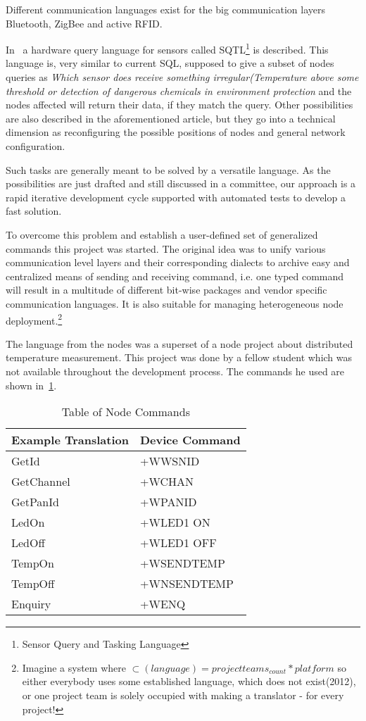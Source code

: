 Different communication languages exist for the big communication layers Bluetooth, ZigBee and active RFID.

In~\cite[p. 407]{Akyildiz02wirelesssensor} a hardware query language for sensors called \textsc{SQTL}\footnote{Sensor Query and Tasking Language}
is described. This language is, very similar to current \textsc{SQL}, supposed to give a subset of nodes queries as \textit{Which sensor does receive
something irregular(Temperature above some threshold or detection of dangerous chemicals in environment protection} and the nodes affected 
will return their data, if they match the query. Other possibilities are also described in the aforementioned article, but they go into a technical
dimension as reconfiguring the possible positions of nodes and general network configuration.

Such tasks are generally meant to be solved by a versatile language. As the possibilities are just drafted and still discussed in a committee, our 
approach is a rapid iterative development cycle supported with automated tests to develop a fast solution.

To overcome this problem and establish a user-defined set of generalized commands this project was started.
The original idea was to unify various communication level layers and their corresponding dialects to 
archive easy and centralized means of sending and receiving command, i.e. one typed command will result in 
a multitude of different bit-wise packages and vendor specific communication languages.
It is also suitable for managing heterogeneous node deployment.\footnote{Imagine a system where \(\subset(language)=project teams_{count} * platform \) 
so either everybody uses some established language, which does not exist(2012), or one project team is solely occupied with 
making a translator - for every project!}

The language from the nodes was a superset of a node project about distributed temperature measurement. This project was done by 
a fellow student which was not available throughout the development process. The commands he used are shown in~\ref{tab:nodecommands}.

\begin{table}[!h] 
\centering 
\begin{tabular}{|l||l|} 
Example Translation & Device Command \\ 
\hline
GetId & +WWSNID \\
GetChannel & +WCHAN \\
GetPanId & +WPANID \\
LedOn & +WLED1 ON \\
LedOff & +WLED1 OFF \\
TempOn & +WSENDTEMP \\
TempOff & +WNSENDTEMP \\
Enquiry & +WENQ \\
\end{tabular} 
\caption{ Table of Node Commands} 
\label{tab:nodecommands} 
\end{table}

